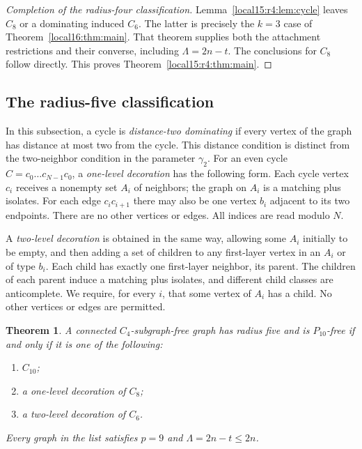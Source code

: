 \documentclass[11pt,a4paper]{article}
\newtheorem{theorem}{Theorem}[section]
\theoremstyle{definition}\newtheorem{definition}[theorem]{Definition}
\theoremstyle{remark}\newtheorem{remark}[theorem]{Remark}
\begin{document}
\begin{proof}[Completion of the radius-four classification]
Lemma~\ref{local15:r4:lem:cycle} leaves $C_8$ or a dominating induced
$C_6$. The latter is precisely the $k=3$ case of
Theorem~\ref{local16:thm:main}. That theorem supplies both the attachment
restrictions and their converse, including $\Lambda=2n-t$.
The conclusions for $C_8$ follow directly. This proves
Theorem~\ref{local15:r4:thm:main}.
\end{proof}


\subsection{The radius-five classification}
In this subsection, a cycle is \emph{distance-two dominating} if every
vertex of the graph has distance at most two from the cycle. This
distance condition is distinct from the two-neighbor condition in the
parameter $\gamma_2$.
For an even cycle $C=c_0\dots c_{N-1}c_0$, a \emph{one-level decoration}
has the following form. Each cycle vertex $c_i$ receives a nonempty
set $A_i$ of neighbors; the graph on $A_i$ is a matching plus isolates.
For each edge $c_ic_{i+1}$ there may also be one vertex $b_i$ adjacent
to its two endpoints. There are no other vertices or edges. All indices
are read modulo $N$.

A \emph{two-level decoration} is obtained in the same way, allowing some
$A_i$ initially to be empty, and then adding a set of children to any
first-layer vertex in an $A_i$ or of type $b_i$. Each child has exactly
one first-layer neighbor, its parent. The children of each parent induce
a matching plus isolates, and different child classes are anticomplete.
We require, for every $i$, that some vertex of $A_i$ has a child. No
other vertices or edges are permitted.

\begin{theorem}\label{local18r:thm:main}
A connected $C_4$-subgraph-free graph has radius five and is $P_{10}$-free
if and only if it is one of the following:
\begin{enumerate}[label=\textup{(\roman*)}]
\item $C_{10}$;
\item a one-level decoration of $C_8$;
\item a two-level decoration of $C_6$.
\end{enumerate}
Every graph in the list satisfies $p=9$ and $\Lambda=2n-t\le2n$.
\end{theorem}
\end{document}
